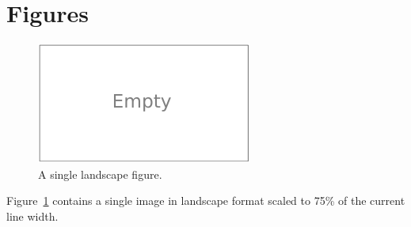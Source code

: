 \section{Figures}
\label{app:how-to:figures}

\begin{figure}
  \centering
  \includegraphics[draft=false,width=0.75\linewidth]{figures/empty_lscape}
  \caption[A single landscape figure]{A single landscape figure.}
  \label{fig:how-to:figures:lscape}
\end{figure}
Figure~\ref{fig:how-to:figures:lscape} contains a single image in landscape format scaled to 75\% of
the current line width.
